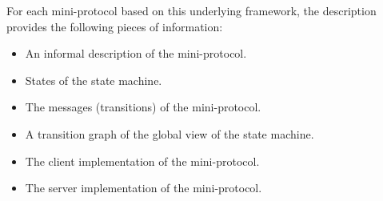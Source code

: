 For each mini-protocol based on this underlying framework, the description provides the
following pieces of information:

\begin{itemize}
\item An informal description of the mini-protocol.
\item States of the state machine.
\item The messages (transitions) of the mini-protocol.
\item A transition graph of the global view of the state machine.
\item The client implementation of the mini-protocol.
\item The server implementation of the mini-protocol.
\end{itemize}

